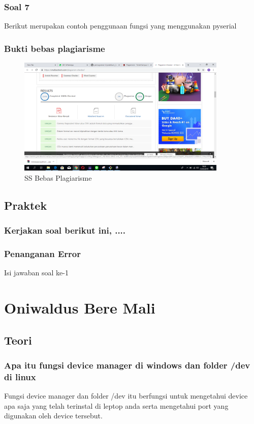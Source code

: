 \subsubsection{Soal 7}


Berikut merupakan contoh penggunaan fungsi yang menggunakan pyserial


\subsubsection{Bukti bebas plagiarisme}
\begin{figure}[h]
\centering
\includegraphics[width=10cm]{figures/5/Teori/1174095/1174095.png}
\caption{SS Bebas Plagiarisme}
\label{dzihan}
\end{figure}

\subsection{Praktek}
\subsubsection{Kerjakan soal berikut ini, ....}
\subsubsection{Penanganan Error}
Isi jawaban soal ke-1


\section{Oniwaldus Bere Mali}
\subsection{Teori}
\subsubsection{Apa itu fungsi device manager di windows dan folder /dev di linux}
Fungsi device manager dan folder /dev itu berfungsi untuk mengetahui device apa saja yang telah terinstal di leptop anda serta mengetahui port yang digunakan oleh device tersebut.

